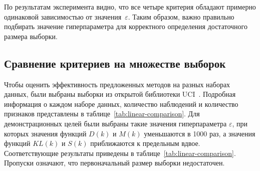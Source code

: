 По результатам эксперимента видно, что все четыре критерия обладают примерно одинаковой зависимостью от значения~$\varepsilon$. Таким образом, важно правильно подбирать значение гиперпараметра для корректного определения достаточного размера выборки.

\subsection{Сравнение критериев на множестве выборок}\label{subsec:exp-comparison}

Чтобы оценить эффективность предложенных методов на разных наборах данных, были выбраны выборки из открытой библиотеки UCI~. Подробная информация о каждом наборе данных, количество наблюдений и количество признаков представлены в таблице~\ref{tab:linear-comparison}. Для демонстрационных целей были выбраны такие значения гиперпараметра $\varepsilon$, при которых значения функций $D(k)$ и $M(k)$ уменьшаются в 1000 раз, а значения функций $KL(k)$ и $S(k)$ приближаются к предельным вдвое. Соответствующие результаты приведены в таблице~\ref{tab:linear-comparison}. Пропуски означают, что первоначальный размер выборки недостаточен.

